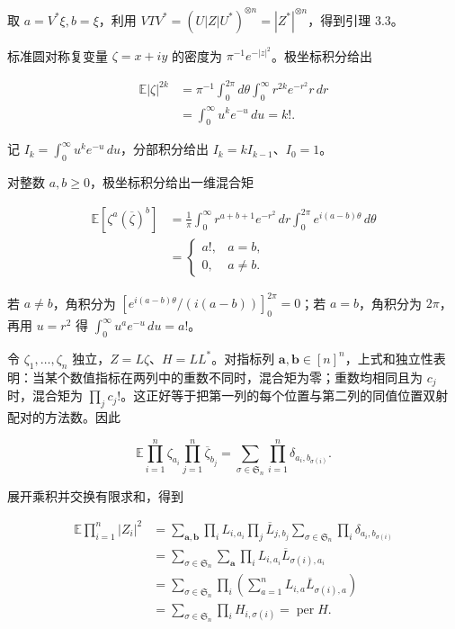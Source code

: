 \documentclass[11pt,a4paper]{article}
\begin{document}
取 \(a=V^*\xi,b=\xi\)，利用 \(VTV^*=(U|Z|U^*)^{\otimes n}=|Z^*|^{\otimes n}\)，得到引理 3.3。

标准圆对称复变量 \(\zeta=x+iy\) 的密度为 \(\pi^{-1}e^{-|z|^2}\)。极坐标积分给出

\[
\begin{aligned}
\mathbb E|\zeta|^{2k}
&=\pi^{-1}\int_0^{2\pi}\!d\theta\int_0^{\infty}r^{2k}e^{-r^2}r\,dr\\
&=\int_0^{\infty}u^ke^{-u}\,du=k!.
\end{aligned}
\]

记 \(I_k=\int_0^\infty u^ke^{-u}\,du\)，分部积分给出 \(I_k=kI_{k-1}\)、\(I_0=1\)。

对整数 \(a,b\ge0\)，极坐标积分给出一维混合矩

\[
\begin{aligned}
\mathbb E[\zeta^a(\overline\zeta)^b]
&=\frac1\pi\int_0^\infty r^{a+b+1}e^{-r^2}\,dr
\int_0^{2\pi}e^{i(a-b)\theta}\,d\theta\\
&=\begin{cases}a!,&a=b,\\0,&a\ne b.\end{cases}
\end{aligned}
\]

若 \(a\ne b\)，角积分为 \([e^{i(a-b)\theta}/(i(a-b))]_0^{2\pi}=0\)；若 \(a=b\)，角积分为 \(2\pi\)，再用 \(u=r^2\) 得 \(\int_0^\infty u^ae^{-u}\,du=a!\)。

令 \(\zeta_1,\ldots,\zeta_n\) 独立，\(Z=L\zeta\)、\(H=LL^*\)。对指标列 \(\boldsymbol a,\boldsymbol b\in[n]^n\)，上式和独立性表明：当某个数值指标在两列中的重数不同时，混合矩为零；重数均相同且为 \(c_j\) 时，混合矩为 \(\prod_jc_j!\)。这正好等于把第一列的每个位置与第二列的同值位置双射配对的方法数。因此

\[
\mathbb E\prod_{i=1}^n\zeta_{a_i}\prod_{j=1}^n\overline\zeta_{b_j}
=\sum_{\sigma\in \mathfrak S_n}\prod_{i=1}^n\delta_{a_i,b_{\sigma(i)}}.
\]

展开乘积并交换有限求和，得到

\[
\begin{aligned}
\mathbb E\prod_{i=1}^n|Z_i|^2
&=\sum_{\boldsymbol a,\boldsymbol b}
\prod_iL_{i,a_i}\prod_j\overline L_{j,b_j}
\sum_{\sigma\in \mathfrak S_n}\prod_i\delta_{a_i,b_{\sigma(i)}}\\
&=\sum_{\sigma\in \mathfrak S_n}\sum_{\boldsymbol a}
\prod_i L_{i,a_i}\overline L_{\sigma(i),a_i}\\
&=\sum_{\sigma\in \mathfrak S_n}\prod_i
\left(\sum_{a=1}^nL_{i,a}\overline L_{\sigma(i),a}\right)\\
&=\sum_{\sigma\in \mathfrak S_n}\prod_iH_{i,\sigma(i)}
=\operatorname{per}H.
\end{aligned}
\]
\end{document}

